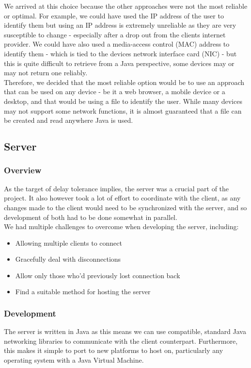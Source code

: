 \documentclass[11pt]{article}
\begin{document}
We arrived at this choice because the other approaches were not the most reliable or optimal. For example, we could have used the IP address of the user to identify them but using an IP address is extremely unreliable as they are very susceptible to change - especially after a drop out from the clients internet provider. We could have also used a media-access control (MAC) address to identify them - which is tied to the devices network interface card (NIC) - but this is quite difficult to retrieve from a Java perspective, some devices may or may not return one reliably. \\

Therefore, we decided that the most reliable option would be to use an approach that can be used on any device - be it a web browser, a mobile device or a desktop, and that would be using a file to identify the user. While many devices may not support some network functions, it is almost guaranteed that a file can be created and read anywhere Java is used. 

\newpage
\subsection{Server}
\subsubsection{Overview}
As the target of delay tolerance implies, the server was a crucial part of the project. It also however took a lot of effort to coordinate with the client, as any changes made to the client would need to be synchronized with the server, and so development of both had to be done somewhat in parallel. \\

We had multiple challenges to overcome when developing the server, including: \\

\begin{itemize}
	\item Allowing multiple clients to connect
	\item Gracefully deal with disconnections
	\item Allow only those who'd previously lost connection back
	\item Find a suitable method for hosting the server
\end{itemize}


\subsubsection{Development}
The server is written in Java as this means we can use compatible, standard Java networking libraries to communicate with the client counterpart. Furthermore, this makes it simple to port to new platforms to host on, particularly any operating system with a Java Virtual Machine. \\
\end{document}
